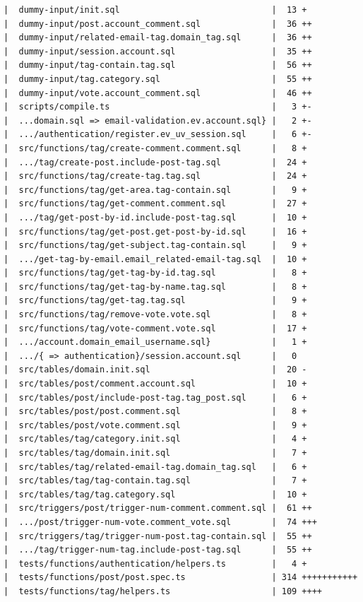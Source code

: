 \documentclass[12pt]{article}
\begin{document}
\begin{lstlisting}[numbers=none,breaklines=true]
|  dummy-input/init.sql                              |  13 +
|  dummy-input/post.account_comment.sql              |  36 ++
|  dummy-input/related-email-tag.domain_tag.sql      |  36 ++
|  dummy-input/session.account.sql                   |  35 ++
|  dummy-input/tag-contain.tag.sql                   |  56 ++
|  dummy-input/tag.category.sql                      |  55 ++
|  dummy-input/vote.account_comment.sql              |  46 ++
|  scripts/compile.ts                                |   3 +-
|  ...domain.sql => email-validation.ev.account.sql} |   2 +-
|  .../authentication/register.ev_uv_session.sql     |   6 +-
|  src/functions/tag/create-comment.comment.sql      |   8 +
|  .../tag/create-post.include-post-tag.sql          |  24 +
|  src/functions/tag/create-tag.tag.sql              |  24 +
|  src/functions/tag/get-area.tag-contain.sql        |   9 +
|  src/functions/tag/get-comment.comment.sql         |  27 +
|  .../tag/get-post-by-id.include-post-tag.sql       |  10 +
|  src/functions/tag/get-post.get-post-by-id.sql     |  16 +
|  src/functions/tag/get-subject.tag-contain.sql     |   9 +
|  .../get-tag-by-email.email_related-email-tag.sql  |  10 +
|  src/functions/tag/get-tag-by-id.tag.sql           |   8 +
|  src/functions/tag/get-tag-by-name.tag.sql         |   8 +
|  src/functions/tag/get-tag.tag.sql                 |   9 +
|  src/functions/tag/remove-vote.vote.sql            |   8 +
|  src/functions/tag/vote-comment.vote.sql           |  17 +
|  .../account.domain_email_username.sql}            |   1 +
|  .../{ => authentication}/session.account.sql      |   0
|  src/tables/domain.init.sql                        |  20 -
|  src/tables/post/comment.account.sql               |  10 +
|  src/tables/post/include-post-tag.tag_post.sql     |   6 +
|  src/tables/post/post.comment.sql                  |   8 +
|  src/tables/post/vote.comment.sql                  |   9 +
|  src/tables/tag/category.init.sql                  |   4 +
|  src/tables/tag/domain.init.sql                    |   7 +
|  src/tables/tag/related-email-tag.domain_tag.sql   |   6 +
|  src/tables/tag/tag-contain.tag.sql                |   7 +
|  src/tables/tag/tag.category.sql                   |  10 +
|  src/triggers/post/trigger-num-comment.comment.sql |  61 ++
|  .../post/trigger-num-vote.comment_vote.sql        |  74 +++
|  src/triggers/tag/trigger-num-post.tag-contain.sql |  55 ++
|  .../tag/trigger-num-tag.include-post-tag.sql      |  55 ++
|  tests/functions/authentication/helpers.ts         |   4 +
|  tests/functions/post/post.spec.ts                 | 314 +++++++++++
|  tests/functions/tag/helpers.ts                    | 109 ++++

\end{lstlisting}
\end{document}
